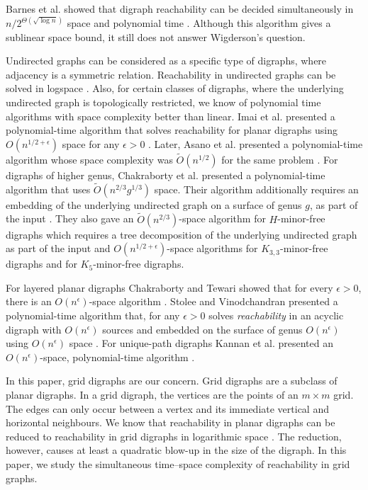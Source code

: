 \documentclass[11pt]{article}
\numberwithin{equation}{section}
\theoremstyle{definition}
\theoremstyle{plain}
\begin{document}
Barnes et al.  %
showed that 
%
digraph reachability %
can be decided simultaneously in $n/2^{\Theta(\sqrt{\log n})}$ space and polynomial time \cite{BBRS}. Although this algorithm gives a sublinear %
space bound,  %
it still does not %
answer Wigderson's question.

Undirected graphs can be considered as a specific type of digraphs,
where %
adjacency
%
%
%
%
is a symmetric relation.
Reachability in undirected %
graphs  %
can be solved in logspace \cite{Reingold}. %
%
%
Also, for certain classes of digraphs, where the underlying undirected graph is topologically restricted, we know of polynomial time algorithms with space complexity better than linear. %
%
%
%
Imai et al. presented  
a polynomial-time algorithm that %
solves  %
reachability for planar 
digraphs %
using $O(n^{1/2 + \epsilon})$ space for any $\epsilon >0$ \cite{Imai}. Later, Asano et al. presented a polynomial-time algorithm whose space complexity was $\tilde{O}(n^{1/2})$ for the same problem \cite{Asano}. For 
digraphs %
of higher genus, Chakraborty et al. presented a polynomial-time algorithm that uses $\tilde{O}(n^{2/3}g^{1/3})$ space. Their algorithm additionally requires an embedding of the 
underlying undirected %
graph on a surface of genus $g$, as part of the input \cite{ChakrabortyPavan}. They also gave an $\tilde{O}(n^{2/3})$-space %
algorithm for %
$H$-minor-free   %
digraphs %
which requires
a  %
tree decomposition of the 
underlying undirected %
graph as 
%
part of the %
 input and $O(n^{1/2 + \epsilon})$-space
%
%
%
%
%
%
%
%
%
%
algorithms for
%
%
$K_{3,3}$-minor-free digraphs and for $K_5$-minor-free digraphs. %

For layered planar 
digraphs %
Chakraborty and Tewari showed that for every $\epsilon >0$, there is an $O(n^{\epsilon})$-space %
algorithm \cite{Chakraborty}. Stolee and Vinodchandran presented a polynomial-time algorithm that, for any $\epsilon > 0$ solves \emph{reachability} in 
%
an acyclic digraph %
with $O(n^{\epsilon})$ sources and embedded on the surface of genus $O(n^\epsilon)$ using $O(n^{\epsilon})$ space \cite{Stolee}. For unique-path 
digraphs %
Kannan et al. presented an %
$O(n^{\epsilon})$-space, %
%
polynomial-time algorithm \cite{kannan}.

In this paper, grid 
digraphs %
are our concern. Grid
digraphs %
are a subclass of planar
digraphs. %
In a grid 
digraph, %
%
the  %
vertices are
the %
%
points %
of an $m \times m$ grid.  %
%
The edges can only occur between a vertex and its immediate vertical
%
and  %
horizontal neighbours.  %
We know that reachability in planar 
digraphs %
%
can  %
be reduced to reachability in grid
digraphs %
 in logarithmic space \cite{Allender}. The reduction, however, causes at least a quadratic blow-up in the size of the 
digraph. %
In this paper, we study the simultaneous time--space complexity of reachability in grid graphs.
\end{document}
